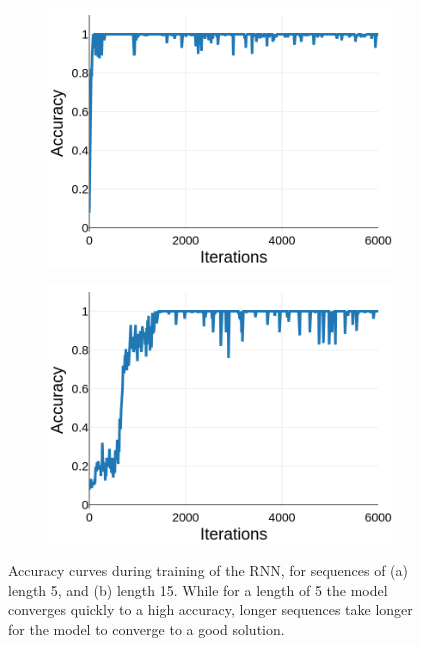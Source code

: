 \documentclass{article}
\begin{document}
\begin{figure}[t]
\begin{subfigure}{0.49\textwidth}
\centering
\includegraphics[scale=0.22]{img/rnn-acc-L5}
\caption{}
\end{subfigure}
\begin{subfigure}{0.49\textwidth}
\centering
\includegraphics[scale=0.22]{img/rnn-acc-L15}
\caption{}
\end{subfigure}
 \caption{Accuracy curves during training of the RNN, for sequences of (a) length 5, and (b) length 15. While for a length of 5 the model converges quickly to a high accuracy, longer sequences take longer for the model to converge to a good solution.}
\label{fig:rnn_acc_curves}
\end{figure}
\end{document}
